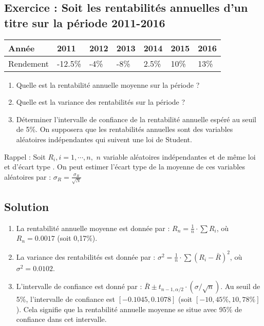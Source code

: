 \documentclass[a4paper, 12pt]{report}
\begin{document}
\subsection{Exercice : Soit les rentabilités annuelles d'un titre sur la période 2011-2016}

\begin{center}
	\begin{tabular}{@{}lllllll@{}}
	\toprule
	Année     & 2011    & 2012 & 2013 & 2014  & 2015 & 2016 \\ \midrule
	Rendement & -12.5\% & -4\% & -8\% & 2.5\% & 10\% & 13\% \\ \bottomrule
\end{tabular}
\end{center}


\begin{enumerate}
	\item Quelle est la rentabilité annuelle moyenne sur la période ?
	\item Quelle est la variance des rentabilités sur la période ?
	\item Déterminer l'intervalle de confiance de la rentabilité annuelle espéré au seuil de 5\%. On supposera que les rentabilités annuelles sont des variables aléatoires indépendantes  qui suivent une loi de Student.
\end{enumerate}

Rappel : Soit \(  R_i, i =1,\cdots,n, \) \( n \) variable aléatoires indépendantes et de même loi et d'écart type  . On peut estimer l'écart type de la moyenne de ces variables aléatoires par : \( \sigma_R = \frac{\sigma_R }{\sqrt{N}} \)

\subsection{Solution}

\begin{enumerate}
	\item La rentabilité annuelle moyenne est donnée par : $R_n = \frac{1}{n} \cdot \sum R_i$, où $R_n = 0.0017$ (soit 0,17\%).
	\item La variance des rentabilités est donnée par : $\sigma^2 = \frac{1}{n} \cdot \sum (R_i - \bar{R})^2$, où $\sigma^2 = 0.0102$.
	\item L'intervalle de confiance est donné par : $\bar{R} \pm t_{n-1,\alpha/2} \cdot (\sigma / \sqrt{n})$. Au seuil de 5\%, l'intervalle de confiance est $[-0.1045, 0.1078]$ (soit $[-10,45\%, 10,78\%]$). Cela signifie que la rentabilité annuelle moyenne se situe avec 95\% de confiance dans cet intervalle.
\end{enumerate}
\end{document}
